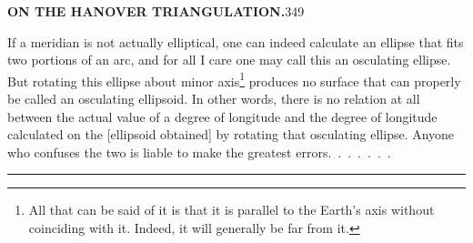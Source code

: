 \clearpage
\noindent\textbf{ON THE HANOVER TRIANGULATION.}\hfill349
\par\medskip
\begingroup
\makeatletter
\renewcommand{\@makefnmark}{\hbox{\normalfont\textsuperscript{*})}}
\makeatother
If a meridian is not actually elliptical, one can indeed
calculate an ellipse that fits two portions of an arc, and
for all I care one may call this an osculating ellipse. But
rotating this ellipse about  minor axis\footnote{\hspace{.25em}All that can be said of it is that it is parallel to the Earth's axis without coinciding with it. Indeed, it will generally be far from it.} produces no surface that
can properly be called an osculating ellipsoid. In other words, there is
no relation at all between the actual value of a degree of longitude and the degree of longitude
calculated on the [ellipsoid obtained] by rotating that osculating ellipse.
Anyone who confuses the two is liable to make
the greatest errors.\ .\ .\ .\ .\ .\ .
\endgroup
\begin{center}\rule{.26\linewidth}{.4pt}\end{center}
